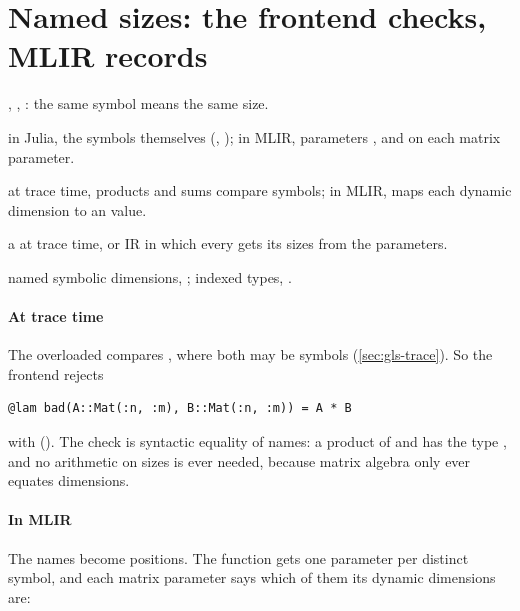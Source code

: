 \section{Named sizes: the frontend checks, MLIR records}
\label{sec:shapes-dims}

\begin{steps}
\item[Input] , , : the same symbol means the same size.
\item[Representation] in Julia, the symbols themselves (, ); in MLIR,  parameters ,  and  on each matrix parameter.
\item[Rule] at trace time, products and sums compare symbols; in MLIR,  maps each dynamic dimension to an  value.
\item[Output] a  at trace time, or IR in which every  gets its sizes from the parameters.
\item[Theory] named symbolic dimensions, ; indexed types, .
\end{steps}

\paragraph{At trace time} The overloaded \code{*} compares
, where both may be symbols
(\cref{sec:gls-trace}). So the frontend rejects
\begin{lstlisting}[style=jl]
@lam bad(A::Mat(:n, :m), B::Mat(:n, :m)) = A * B
\end{lstlisting}
with 
(). The check is syntactic equality of names: a
product of  and  has the type
, and no arithmetic on sizes is ever needed, because
matrix algebra only ever equates dimensions.

\paragraph{In MLIR} The names become positions. The function gets one
 parameter per distinct symbol, and each matrix parameter says
which of them its dynamic dimensions are:


